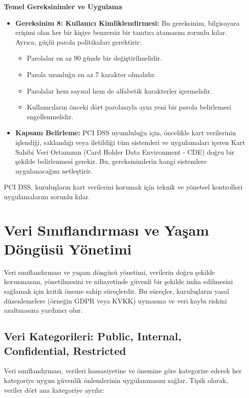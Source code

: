 \textbf{Temel Gereksinimler ve Uygulama}

\begin{itemize}
    \item \textbf{Gereksinim 8: Kullanıcı Kimliklendirmesi:} Bu gereksinim, bilgisayara erişimi olan her bir kişiye benzersiz bir tanıtıcı atamasını zorunlu kılar. Ayrıca, güçlü parola politikaları gerektirir:
    \begin{itemize}
        \item Parolalar en az 90 günde bir değiştirilmelidir.
        \item Parola uzunluğu en az 7 karakter olmalıdır.
        \item Parolalar hem sayısal hem de alfabetik karakterler içermelidir.
        \item Kullanıcıların önceki dört parolasıyla aynı yeni bir parola belirlemesi engellenmelidir.
    \end{itemize}
    \item \textbf{Kapsam Belirleme:} PCI DSS uyumluluğu için, öncelikle kart verilerinin işlendiği, saklandığı veya iletildiği tüm sistemleri ve uygulamaları içeren Kart Sahibi Veri Ortamının (Card Holder Data Environment - CDE) doğru bir şekilde belirlenmesi gerekir. Bu, gereksinimlerin hangi sistemlere uygulanacağını netleştirir.
\end{itemize}

PCI DSS, kuruluşların kart verilerini korumak için teknik ve yönetsel kontrolleri uygulamalarını zorunlu kılar.

\section{Veri Sınıflandırması ve Yaşam Döngüsü Yönetimi}

Veri sınıflandırması ve yaşam döngüsü yönetimi, verilerin doğru şekilde korunmasını, yönetilmesini ve nihayetinde güvenli bir şekilde imha edilmesini sağlamak için kritik öneme sahip süreçlerdir. Bu süreçler, kuruluşların yasal düzenlemelere (örneğin GDPR veya KVKK) uymasına ve veri kaybı riskini azaltmasına yardımcı olur.

\subsection{Veri Kategorileri: Public, Internal, Confidential, Restricted}

Veri sınıflandırması, verileri hassasiyetine ve önemine göre kategorize ederek her kategoriye uygun güvenlik önlemlerinin uygulanmasını sağlar. Tipik olarak, veriler dört ana kategoriye ayrılır:

